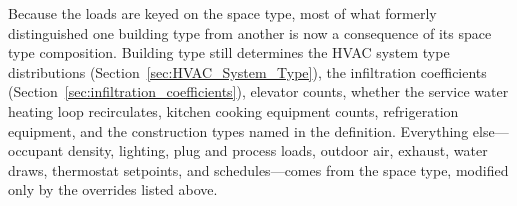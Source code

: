 Because the loads are keyed on the space type, most of what formerly distinguished one building type from another is now a consequence of its space type composition. Building type still determines the HVAC system type distributions (Section~\ref{sec:HVAC_System_Type}), the infiltration coefficients (Section~\ref{sec:infiltration_coefficients}), elevator counts, whether the service water heating loop recirculates, kitchen cooking equipment counts, refrigeration equipment, and the construction types named in the definition. Everything else---occupant density, lighting, plug and process loads, outdoor air, exhaust, water draws, thermostat setpoints, and schedules---comes from the space type, modified only by the overrides listed above.
